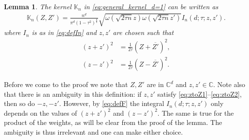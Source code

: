 \documentclass[%
 jmp,
cp,  %
 amsmath,amsthm,amssymb,%
 reprint,%
onecolumn]{revtex4-2}
\newtheorem{lemma}[theorem]{Lemma}
\begin{document}
\begin{lemma}\label{lem:general_kernel}
    The kernel $\mathbb K_n$ in  \eqref{eq:general_kernel_d=1} can be written as
\begin{align} \label{eq:defEllipdIn2}
\mathbb K_n(Z, Z')
= \frac{n^d}{\pi^d (1-\tau^2)^\frac{d}{2}} 
\sqrt{ \omega\left(\sqrt{2\tau n} z\right)  \omega\left(\sqrt{2\tau n} z'\right)} I_n\left(d;\tau; z, z'\right). 
\end{align}
where $I_n$ is as in \eqref{eq:defIn} and $z,z'$ are chosen such that 
\begin{align} \label{eq:ztoZ1}
(z+z')^2&=\frac{1}{2\tau} (Z+\overline{Z'})^2,\\
(z-z')^2&=\frac{1}{2\tau} (Z-\overline{Z'})^2.\label{eq:ztoZ2}
\end{align}
\end{lemma}
Before we come to the proof we note that $Z,Z'$ are in $\mathbb C^d$ and $z,z'\in \mathbb C$. Note also that there is an ambiguity in this definition: if $z,z'$ satisfy \eqref{eq:ztoZ1}--\eqref{eq:ztoZ2}, then so do $-z,-z'$. However, by \eqref{eq:defF} the integral $I_n(d;\tau;z,z')$ only depends on the values of $(z+z')^2$ and $(z-z')^2$. The same is true for the product of the weights, as will be clear from the proof of the lemma. The ambiguity is thus irrelevant and one can make either choice. 
\end{document}
